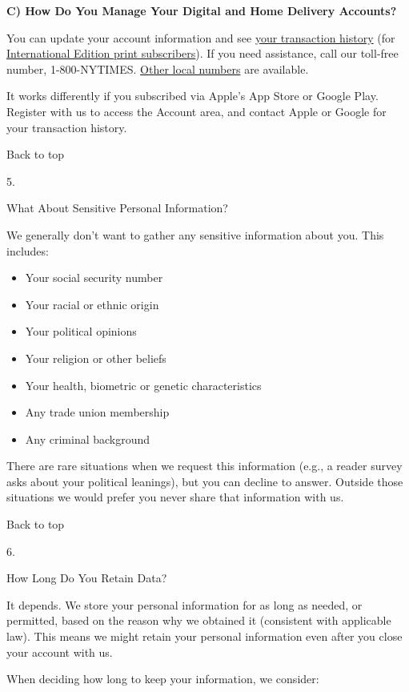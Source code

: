 \textbf{C) How Do You Manage Your Digital and Home Delivery Accounts?}

You can update your account information and see
\href{https://myaccount.nytimes3xbfgragh.onion}{your transaction
history} (for \href{https://customercare.inyt.com}{International Edition
print subscribers}). If you need assistance, call our toll-free number,
1-800-NYTIMES.
\href{https://subscribe.inyt.com/footer?requestAction=displayContactIht}{Other
local numbers} are available.

It works differently if you subscribed via Apple's App Store or Google
Play. Register with us to access the Account area, and contact Apple or
Google for your transaction history.

Back to top

5.

What About Sensitive Personal Information?

We generally don't want to gather any sensitive information about you.
This includes:

\begin{itemize}
\tightlist
\item
  Your social security number
\item
  Your racial or ethnic origin
\item
  Your political opinions
\item
  Your religion or other beliefs
\item
  Your health, biometric or genetic characteristics
\item
  Any trade union membership
\item
  Any criminal background
\end{itemize}

There are rare situations when we request this information (e.g., a
reader survey asks about your political leanings), but you can decline
to answer. Outside those situations we would prefer you never share that
information with us.

Back to top

6.

How Long Do You Retain Data?

It depends. We store your personal information for as long as needed, or
permitted, based on the reason why we obtained it (consistent with
applicable law). This means we might retain your personal information
even after you close your account with us.

When deciding how long to keep your information, we consider:

